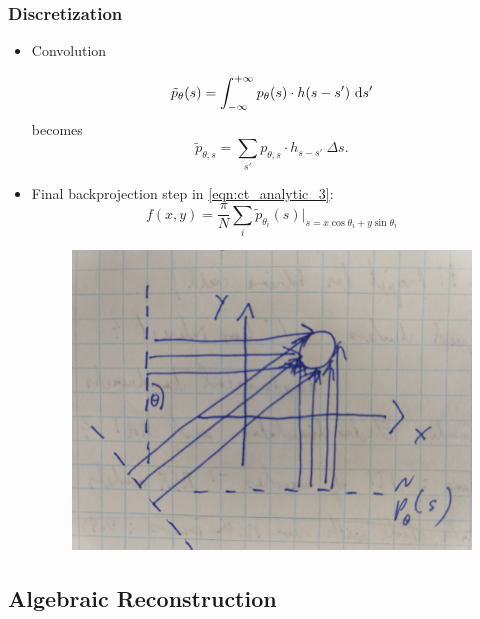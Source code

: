 \begin{frame}
	\frametitle{Discretization}

	\begin{itemize}
		\item Convolution


		      \begin{equation}
			      \tilde{p}_{\theta}(s) = \int_{-\infty}^{+\infty} p_\theta(s) \cdot h(s - s') \ \textnormal d s'
		      \end{equation}
		      becomes
		      \begin{equation}
			      \tilde{p}_{\theta, s} = \sum_{s'} p_{\theta, s} \cdot h_{s - s'}\ \Delta s.
		      \end{equation}

		\item Final backprojection step in \eqref{eqn:ct_analytic_3}:
		      \begin{equation}
			      \label{eqn:ct_analytic_3}
			      f(x, y) = \frac{\pi}{N} \sum_i \tilde{p}_{\theta_i}(s) |_{s=x \cos \theta_i + y \sin \theta_i}
		      \end{equation}


	\begin{figure}[tbp]
		\centering
		\includegraphics[width=0.15\linewidth]{images/backprojection_sketch}
	\end{figure}
	
	\end{itemize}

\end{frame}

\subsection{Algebraic Reconstruction}
\label{sub:ct_algebraic}

